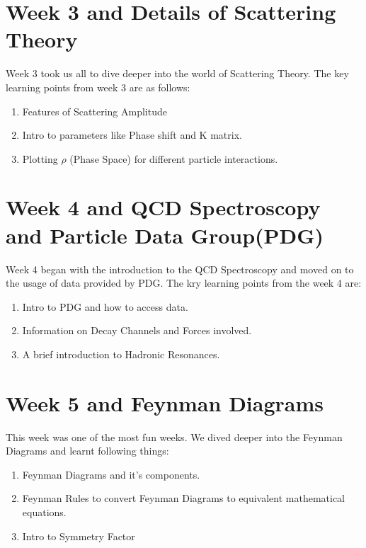 \documentclass[a4paper]{article}
\begin{document}
\section{Week 3 and Details of Scattering Theory}
Week 3 took us all to dive deeper into the world of Scattering Theory. The key learning points from week 3 are as follows: 
\\
\begin{enumerate}
    \item Features of Scattering Amplitude
    \item Intro to parameters like Phase shift and K matrix. 
    \item Plotting $\rho$ (Phase Space) for different particle interactions.
\end{enumerate}


\section{Week 4 and QCD Spectroscopy and Particle Data Group(PDG)}
Week 4 began with the introduction to the QCD Spectroscopy and moved on to the usage of data provided by PDG. The kry learning points from the week 4 are:
\\
\begin{enumerate}
    \item Intro to PDG and how to access data.
    \item Information on Decay Channels and Forces involved. 
    \item A brief introduction to Hadronic Resonances.
\end{enumerate}


\section{Week 5 and Feynman Diagrams}
This week was one of the most fun weeks. We dived deeper into the Feynman Diagrams and learnt following things: 
\\
\begin{enumerate}
    \item Feynman Diagrams and it's components. 
    \item Feynman Rules to convert Feynman Diagrams to equivalent mathematical equations.
    \item Intro to Symmetry Factor
\end{enumerate}
\end{document}
